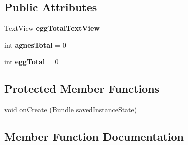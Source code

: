 \subsection*{Public Attributes}
\begin{DoxyCompactItemize}
\item 
\mbox{\label{classnet_1_1mobiledevelopment_1_1camandeggs_1_1_add_eggs_activity_aada00f2e6f6daefca183af4237e5405b}} 
Text\+View {\bfseries egg\+Total\+Text\+View}
\item 
\mbox{\label{classnet_1_1mobiledevelopment_1_1camandeggs_1_1_add_eggs_activity_aedd93454d85bb4014e0d6de514f43eae}} 
int {\bfseries agnes\+Total} = 0
\item 
\mbox{\label{classnet_1_1mobiledevelopment_1_1camandeggs_1_1_add_eggs_activity_a8475dbe28b3b01309db240a335d04092}} 
int {\bfseries egg\+Total} = 0
\end{DoxyCompactItemize}
\subsection*{Protected Member Functions}
\begin{DoxyCompactItemize}
\item 
void \hyperlink{classnet_1_1mobiledevelopment_1_1camandeggs_1_1_add_eggs_activity_af3bf6afd97bd62306181e63ee36a7ad0}{on\+Create} (Bundle saved\+Instance\+State)
\end{DoxyCompactItemize}


\subsection{Member Function Documentation}
\mbox{\label{classnet_1_1mobiledevelopment_1_1camandeggs_1_1_add_eggs_activity_af3bf6afd97bd62306181e63ee36a7ad0}} 
